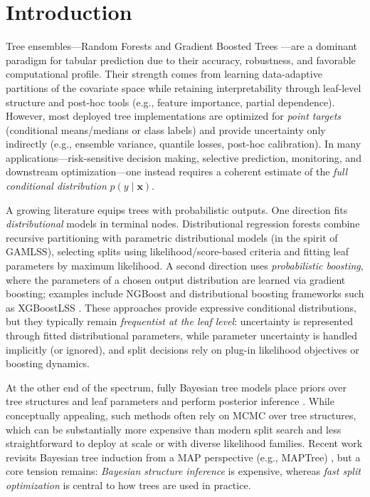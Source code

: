 \documentclass[twoside,11pt]{article}
\begin{document}
\section{Introduction}\label{sec:intro}

Tree ensembles---Random Forests \citep{breiman2001random} and Gradient Boosted Trees \citep{friedman2001greedy,chen2016xgboost,ke2017lightgbm}---are a dominant paradigm for tabular prediction due to their accuracy, robustness, and favorable computational profile.
Their strength comes from learning data-adaptive partitions of the covariate space while retaining interpretability through leaf-level structure and post-hoc tools (e.g., feature importance, partial dependence).
However, most deployed tree implementations are optimized for \emph{point targets} (conditional means/medians or class labels) and provide uncertainty only indirectly (e.g., ensemble variance, quantile losses, post-hoc calibration).
In many applications---risk-sensitive decision making, selective prediction, monitoring, and downstream optimization---one instead requires a coherent estimate of the \emph{full conditional distribution} $p(y\mid \mathbf{x})$.

A growing literature equips trees with probabilistic outputs.
One direction fits \emph{distributional} models in terminal nodes.
Distributional regression forests \citep{schlosser2019distributional} combine recursive partitioning with parametric distributional models (in the spirit of GAMLSS), selecting splits using likelihood/score-based criteria and fitting leaf parameters by maximum likelihood.
A second direction uses \emph{probabilistic boosting}, where the parameters of a chosen output distribution are learned via gradient boosting; examples include NGBoost \citep{duan2020ngboost} and distributional boosting frameworks such as XGBoostLSS \citep{marz2019xgboostlss}.
These approaches provide expressive conditional distributions, but they typically remain \emph{frequentist at the leaf level}: uncertainty is represented through fitted distributional parameters, while parameter uncertainty is handled implicitly (or ignored), and split decisions rely on plug-in likelihood objectives or boosting dynamics.

At the other end of the spectrum, fully Bayesian tree models place priors over tree structures and leaf parameters and perform posterior inference \citep{denison1998bayesian,chipman2010bart}.
While conceptually appealing, such methods often rely on MCMC over tree structures, which can be substantially more expensive than modern split search and less straightforward to deploy at scale or with diverse likelihood families.
Recent work revisits Bayesian tree induction from a MAP perspective (e.g., MAPTree) \citep{sullivan2024maptree}, but a core tension remains: \emph{Bayesian structure inference} is expensive, whereas \emph{fast split optimization} is central to how trees are used in practice.
\end{document}
